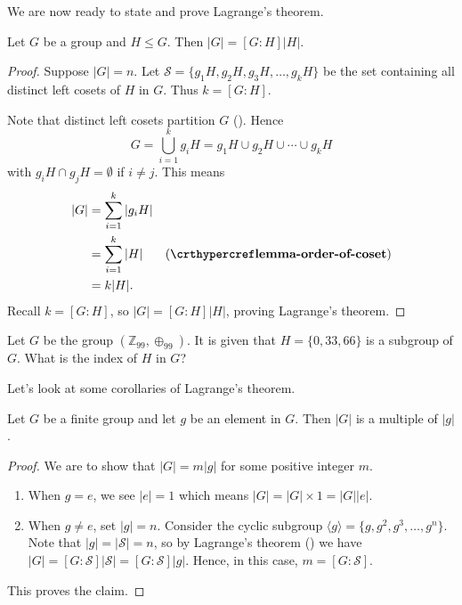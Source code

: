 We are now ready to state and prove Lagrange's theorem.
\begin{theorem}[Lagrange]\label{thrm-lagrange}
    Let $G$ be a group and $H \leq G$. Then $|G| = [G:H]|H|$.
\end{theorem}
\begin{proof}
    Suppose $|G| = n$. Let $\mathcal{S} = \{g_1H, g_2H, g_3H, \dots, g_kH\}$ be the set containing all distinct left cosets of $H$ in $G$. Thus $k = [G: H]$.

    Note that distinct left cosets partition $G$ (). Hence
    \[
        G = \bigcup_{i=1}^k g_iH = g_1H \cup g_2H \cup \cdots \cup g_kH
    \]
    with $g_iH \cap g_jH = \emptyset$ if $i \neq j$. This means
    \begin{align*}
        |G| &= \sum_{i=1}^k|g_iH|\\
        &=\sum_{i=1}^k|H| & (\myref{lemma-order-of-coset})\\
        &= k|H|.
    \end{align*}
    Recall $k = [G: H]$, so $|G| = [G:H]|H|$, proving Lagrange's theorem.
\end{proof}

\begin{exercise}
    Let $G$ be the group $(\mathbb{Z}_{99}, \oplus_{99})$. It is given that $H = \{0, 33, 66\}$ is a subgroup of $G$. What is the index of $H$ in $G$?
\end{exercise}

Let's look at some corollaries of Lagrange's theorem.
\begin{corollary}\label{corollary-order-of-group-multiple-of-order-of-element}
    Let $G$ be a finite group and let $g$ be an element in $G$. Then $|G|$ is a multiple of $|g|$.
\end{corollary}
\begin{proof}
    We are to show that $|G| = m|g|$ for some positive integer $m$.
    \begin{enumerate}
        \item When $g = e$, we see $|e| = 1$ which means $|G| = |G| \times 1 = |G||e|$.
        \item When $g \neq e$, set $|g| = n$. Consider the cyclic subgroup $\langle g \rangle = \{g, g^2, g^3, \dots, g^n\}$. Note that $|g| = |\mathcal{S}| = n$, so by Lagrange's theorem () we have $|G| = [G:\mathcal{S}]|\mathcal{S}| = [G:\mathcal{S}]|g|$. Hence, in this case, $m = [G:\mathcal{S}]$.
    \end{enumerate}
    This proves the claim.
\end{proof}

